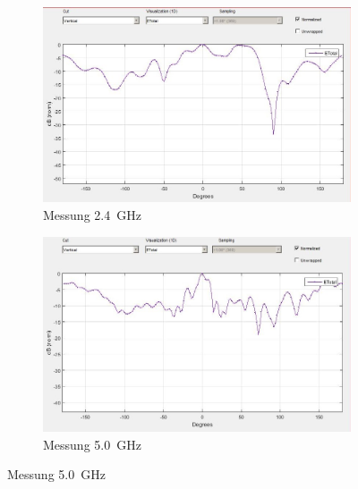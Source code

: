 \begin{figure}[h!]
	\begin{subfigure}[t]{0.49\textwidth}
	 	\includegraphics[width=1\textwidth]{../fig/plt/2_4GHz_E_tot_curve.jpg}
		\caption{Messung \SI{2.4}{\giga\hertz}}
	\end{subfigure}
	\begin{subfigure}[t]{0.49\textwidth}
		\includegraphics[width=1\textwidth]{../fig/plt/5GHz_E_tot_curve.jpg}
		\caption{Messung \SI{5.0}{\giga\hertz}}
	\end{subfigure}
\end{figure}


